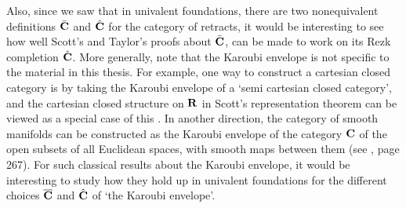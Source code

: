 Also, since we saw that in univalent foundations, there are two nonequivalent definitions $ \bar {\mathbf{C}} $ and $ \hat {\mathbf{C}} $ for the category of retracts, it would be interesting to see how well Scott's and Taylor's proofs about $ \bar {\mathbf{C}} $, can be made to work on its Rezk completion $ \hat {\mathbf{C}} $. More generally, note that the Karoubi envelope is not specific to the material in this thesis. For example, one way to construct a cartesian closed category is by taking the Karoubi envelope of a `semi cartesian closed category', and the cartesian closed structure on $ \mathbf{R} $ in Scott's representation theorem can be viewed as a special case of this \autocite{hayashi-1985-semifunctors}. In another direction, the category of smooth manifolds can be constructed as the Karoubi envelope of the category $ \mathbf{C} $ of the open subsets of all Euclidean spaces, with smooth maps between them (see \autocite{Lawvere-Karoubi}, page 267). For such classical results about the Karoubi envelope, it would be interesting to study how they hold up in univalent foundations for the different choices $ \overline {\mathbf{C}} $ and $ \hat {\mathbf{C}} $ of `the Karoubi envelope'.

